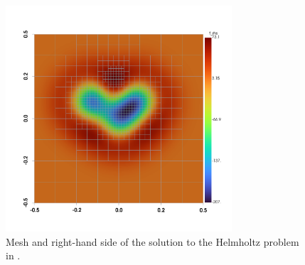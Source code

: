 \begin{figure}
    \centering
    \includegraphics[width=0.75\textwidth, trim={0 100 0 0}]{figures/plot_helmholtz_f.png}
    \caption{Mesh and right-hand side of the solution to the Helmholtz problem in .}
    \label{fig:helmholtz_f_plot}
\end{figure}

